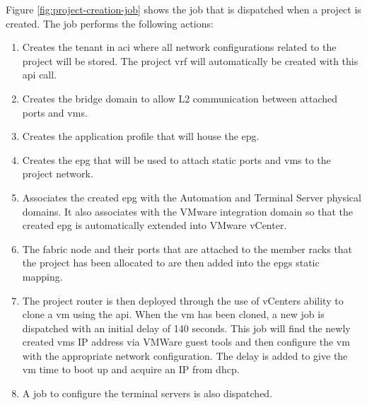 Figure \ref{fig:project-creation-job} shows the job that is dispatched when a project is created. The job performs the following actions:
\begin{enumerate}
    \item Creates the tenant in \gls{aci} where all network configurations related to the project will be stored. The project \gls{vrf} will automatically be created with this \gls{api} call.
    \item Creates the bridge domain to allow L2 communication between attached ports and \gls{vm}s.
    \item Creates the application profile that will house the \gls{epg}.
    \item Creates the \gls{epg} that will be used to attach static ports and \gls{vm}s to the project network.
    \item Associates the created \gls{epg} with the Automation and Terminal Server physical domains. It also associates with the VMware integration domain so that the created \gls{epg} is automatically extended into VMware vCenter.
    \item The fabric node and their ports that are attached to the member racks that the project has been allocated to are then added into the \gls{epg}s static mapping.
    \item The project router is then deployed through the use of vCenters ability to clone a \gls{vm} using the \gls{api}. When the \gls{vm} has been cloned, a new job is dispatched with an initial delay of 140 seconds. This job will find the newly created \gls{vm}s IP address via VMWare guest tools and then configure the \gls{vm} with the appropriate network configuration. The delay is added to give the \gls{vm} time to boot up and acquire an IP from \gls{dhcp}. 
    \item A job to configure the terminal servers is also dispatched.
\end{enumerate}
